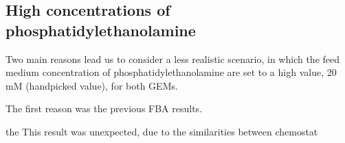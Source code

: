 \subsection{High concentrations of phosphatidylethanolamine}

	Two main reasons lead us to consider a less realistic scenario, in which the feed medium concentration of phosphatidylethanolamine are set to a high value, 20 mM (handpicked value), for both GEMs. 
	
	The first reason was the previous FBA results. 
	
	
	the 
	This result was unexpected, due to the similarities between chemostat 